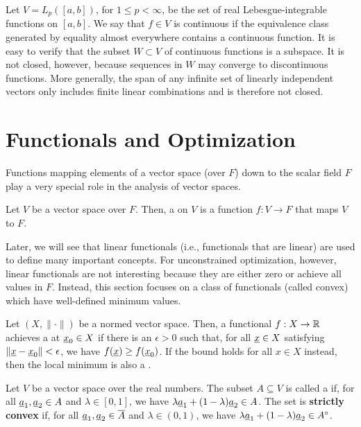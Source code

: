 \begin{example}
Let $V = L_p ( [a,b] )$, for $1\leq p <\infty$, be the set of real Lebesgue-integrable functions on $[a,b]$.
We say that $f \in V$ is continuous if the equivalence class generated by equality almost everywhere contains a continuous function.
It is easy to verify that the subset $W \subset V$ of continuous functions is a subspace.
It is not closed, however, because sequences in $W$ may converge to discontinuous functions.
More generally, the span of any infinite set of linearly independent vectors only includes finite linear combinations and is therefore not closed.
\end{example}

\section{Functionals and Optimization}

Functions mapping elements of a vector space (over $F$) down to the scalar field $F$ play a very special role in the analysis of vector spaces.

\begin{definition}
Let $V$ be a vector space over $F$.
Then, a  on $V$ is a function $f : V \rightarrow F$ that maps $V$ to $F$.
\end{definition}

Later, we will see that linear functionals (i.e., functionals that are linear) are used to define many important concepts.
For unconstrained optimization, however, linear functionals are not interesting because they are either zero or achieve all values in $F$.
Instead, this section focuses on a class of functionals (called convex) which have well-defined minimum values.

\begin{definition}
Let $(X,\|\cdot\|)$ be a normed vector space.
Then, a functional $f: X \rightarrow \mathbb{R}$ achieves a  at $\underline{x}_0 \in X$ if there is an $\epsilon > 0$ such that, for all $\underline{x}\in X$ satisfying $\| \underline{x} - \underline{x}_0 \| < \epsilon$, we have  $f(\underline{x}) \geq f(\underline{x}_0)$.
If the bound holds for all $x\in X$ instead, then the local minimum is also a .
\end{definition}

\begin{definition}
Let $V$ be a vector space over the real numbers.
The subset $A \subseteq V$ is called a  if, for all $\underline{a}_1,\underline{a}_2 \in A$ and $\lambda\in[0,1]$, we have $\lambda \underline{a}_1 + (1-\lambda) \underline{a}_2 \in A$.
The set is \textbf{strictly convex} if, for all $\underline{a}_1,\underline{a}_2 \in \overline{A}$ and $\lambda\in(0,1)$, we have $\lambda \underline{a}_1 + (1-\lambda) \underline{a}_2 \in {A}^{\circ}$.
\end{definition}

